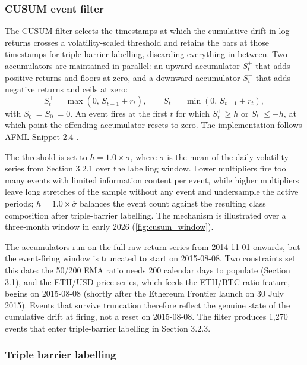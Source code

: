 \subsubsection{CUSUM event filter}\label{subsubsec:cusum}

The CUSUM filter selects the timestamps at which the cumulative drift in log returns crosses a volatility-scaled threshold and retains the bars at those timestamps for triple-barrier labelling, discarding everything in between. Two accumulators are maintained in parallel: an upward accumulator $S^+_t$ that adds positive returns and floors at zero, and a downward accumulator $S^-_t$ that adds negative returns and ceils at zero:
\begin{equation}
S^+_t = \max\!\left(0,\, S^+_{t-1} + r_t\right),\qquad
S^-_t = \min\!\left(0,\, S^-_{t-1} + r_t\right),
\label{eq:cusum}
\end{equation}
with $S^+_0 = S^-_0 = 0$. An event fires at the first $t$ for which $S^+_t \geq h$ or $S^-_t \leq -h$, at which point the offending accumulator resets to zero. The implementation follows AFML Snippet 2.4 \citep{lopez_de_prado_2018}.

The threshold is set to $h = 1.0 \times \overline{\sigma}$, where $\overline{\sigma}$ is the mean of the daily volatility series from Section 3.2.1 over the labelling window. Lower multipliers fire too many events with limited information content per event, while higher multipliers leave long stretches of the sample without any event and undersample the active periods; $h = 1.0 \times \overline{\sigma}$ balances the event count against the resulting class composition after triple-barrier labelling. The mechanism is illustrated over a three-month window in early 2026 \label{ref:cusum_call}(\autoref{fig:cusum_window}).

The accumulators run on the full raw return series from 2014-11-01 onwards, but the event-firing window is truncated to start on 2015-08-08. Two constraints set this date: the 50/200 EMA ratio needs 200 calendar days to populate (Section 3.1), and the ETH/USD price series, which feeds the ETH/BTC ratio feature, begins on 2015-08-08 (shortly after the Ethereum Frontier launch on 30 July 2015). Events that survive truncation therefore reflect the genuine state of the cumulative drift at firing, not a reset on 2015-08-08. The filter produces 1,270 events that enter triple-barrier labelling in Section 3.2.3.


\subsubsection{Triple barrier labelling}\label{subsubsec:tbl}

